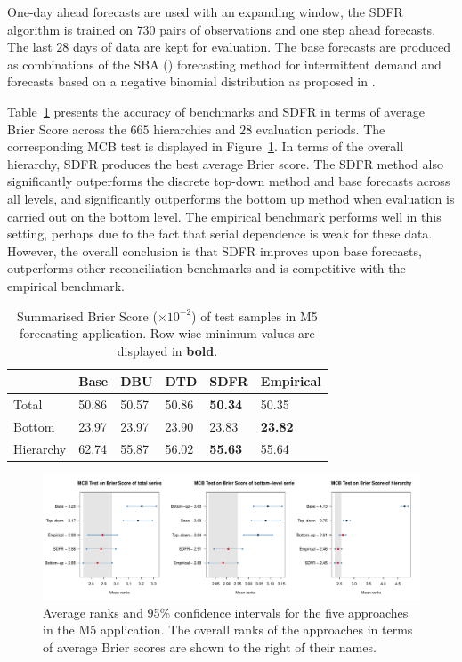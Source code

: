 \documentclass[a4paper,review,12pt,authoryear]{elsarticle}
\theoremstyle{definition}
\begin{document}
     One-day ahead forecasts are used with an expanding window, the SDFR algorithm is trained on $730$ pairs of observations and one step ahead forecasts. The last $28$ days of data are kept for evaluation. The base forecasts are produced as combinations of the SBA (\citealp{syntetosAccuracyIntermittentDemand2005}) forecasting method for intermittent demand and forecasts based on a negative binomial distribution as proposed in \cite{kolassaEvaluatingPredictiveCount2016}.

    Table~\ref{tab:M5} presents the accuracy of benchmarks and SDFR in terms of average Brier Score across the $665$ hierarchies and $28$ evaluation periods. The corresponding MCB test is displayed in Figure~\ref{fig:application_M5}. In terms of the overall hierarchy, SDFR produces the best average Brier score. The SDFR method also significantly outperforms the discrete top-down method and base forecasts across all levels, and significantly outperforms the bottom up method when evaluation is carried out on the bottom level. The empirical benchmark performs well in this setting, perhaps due to the fact that serial dependence is weak for these data. However, the overall conclusion is that SDFR improves upon base forecasts, outperforms other reconciliation benchmarks and is competitive with the empirical benchmark.
   
    \begin{table}
        \centering
        \begin{tabular}{llllll}\toprule
            ~ & Base & DBU & DTD & SDFR & Empirical \\ \midrule
            Total & 50.86 & 50.57 & 50.86 & \textbf{50.34} & 50.35 \\ 
            Bottom & 23.97 & 23.97 & 23.90 & 23.83 & \textbf{23.82} \\ 
            Hierarchy & 62.74 & 55.87 & 56.02 & \textbf{55.63} & 55.64 \\ \bottomrule
        \end{tabular}
        \caption{\label{tab:M5}Summarised Brier Score ($\times 10^{-2}$) of test samples in M5 forecasting application. Row-wise minimum values are displayed in \textbf{bold}.}
    \end{table}


    \begin{figure}[h]
      \caption{\label{fig:application_M5}Average ranks and 95\% confidence intervals for the five approaches in the M5 application. The overall ranks of the approaches in terms of average Brier scores are shown to the right of their names.}
      \centering
      \includegraphics[width=\textwidth]{figures/M5_mcb.pdf}
    \end{figure}
\end{document}
